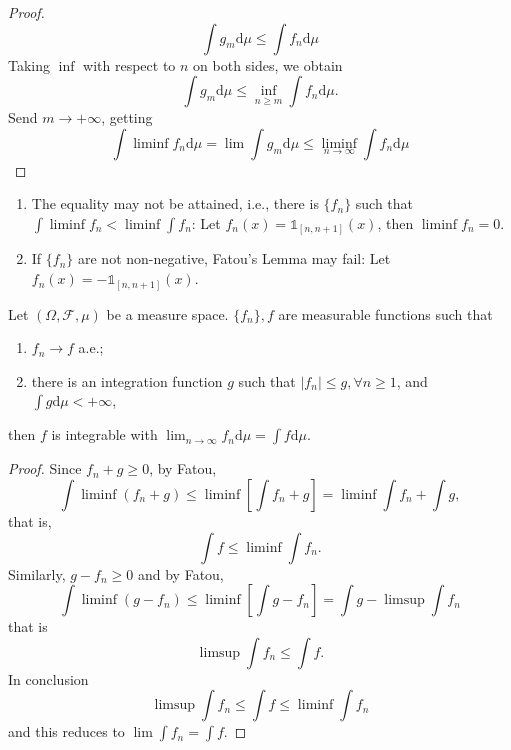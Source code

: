 \documentclass[11pt,singlecolumn, openany, citestyle=authoryear]{elegantbook}
\begin{document}
\begin{CJK}{UTF8}{gbsn}
\begin{proof}
    $$
    \int g_m\mathrm{d}\mu \leqslant \int f_n \mathrm{d}\mu
    $$ 
    Taking $\inf$ with respect to $n$ on both sides, we obtain 
    $$
    \int g_m\mathrm{d}\mu \leqslant \inf_{n\geqslant m}\int f_n\mathrm{d}\mu.
    $$
    Send $m\to+\infty$, getting 
    $$
    \int \liminf f_n\mathrm{d}\mu =
    \lim \int g_m\mathrm{d}\mu \leqslant \liminf_{n\to\infty}\int f_n\mathrm{d}\mu 
    $$
\end{proof}
\begin{remark}
    \begin{enumerate}
        \item The equality may not be attained, i.e., there is $\{f_n\}$ such that 
        $\displaystyle \int \liminf f_n < \liminf \int f_n$:
        Let $f_n(x)=\mathds{1}_{[n,n+1]}(x)$, then $\liminf f_n = 0$.
        \item If $\{f_n\}$ are not non-negative, Fatou's Lemma may fail:
        Let $f_n(x)=-\mathds{1}_{[n,n+1]}(x)$.
    \end{enumerate}
\end{remark}

\begin{theorem}
    Let $(\Omega, \mathcal{F},\mu)$ be a measure space. $\{f_n\},f$ are measurable functions 
    such that 
    \begin{enumerate}
        \item $f_n\to f$ a.e.;
        \item there is an integration function $g$ such that 
        $|f_n|\leqslant g,\forall n\geqslant1$, and $\displaystyle \int g \mathrm{d}\mu < +\infty$,  
    \end{enumerate}
    then $f$ is integrable with $\displaystyle \lim_{n\to\infty} f_n \mathrm{d}\mu 
        = \int f \mathrm{d}\mu$.
\end{theorem}
\begin{proof}
    Since $f_n+g\geqslant 0$, by Fatou, 
    $$
    \int \liminf (f_n+g)\leqslant \liminf \left[\int f_n + g\right]= 
    \liminf \int f_n + \int g,
    $$
    that is, 
    $$
    \int f \leqslant \liminf \int f_n.
    $$
    Similarly, $g-f_n\geqslant 0$ and by Fatou,
    $$ 
    \int \liminf (g-f_n)\leqslant \liminf \left[\int g- f_n\right] = \int g - \limsup 
    \int f_n
    $$
    that is 
    $$
    \limsup \int f_n \leqslant \int f.
    $$
    In conclusion 
    $$
    \limsup \int f_n \leqslant \int f \leqslant \liminf \int f_n 
    $$
    and this reduces to $\displaystyle \lim \int f_n = \int f$.
\end{proof}


\end{CJK}
\end{document}
